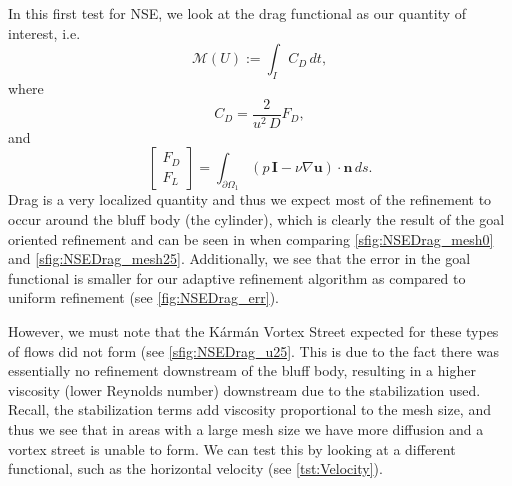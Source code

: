 \begin{test} \label{tst:Drag}
    In this first test for NSE, we look at the drag functional as our quantity
    of interest, i.e.
    \begin{equation}
        \mathcal{M}(U) := \int_I\! C_D\, dt,
        \label{eq:DragFunctional}
    \end{equation}
    where
    \begin{equation*}
        C_D = \frac{2}{u^2\, D}F_D,
    \end{equation*}
    and
    \begin{equation*}
        \begin{bmatrix} F_D \\ F_L \end{bmatrix} =
            \int_{\partial \Omega_1}\! (p\, \mathbf{I} - \nu \nabla
                \mathbf{u})\cdot \mathbf{n}\, ds.
    \end{equation*}
    Drag is a very localized quantity and thus we expect most of the refinement
    to occur around the bluff body (the cylinder), which is clearly the result
    of the goal oriented refinement and can be seen in when comparing
    \autoref{sfig:NSEDrag_mesh0} and \autoref{sfig:NSEDrag_mesh25}.
    Additionally, we see that the error in the goal functional is smaller for
    our adaptive refinement algorithm as compared to uniform refinement (see
    \autoref{fig:NSEDrag_err}).

    However, we must note that the K\'arm\'an Vortex Street expected for these
    types of flows did not form (see \autoref{sfig:NSEDrag_u25}. This is due to
    the fact there was essentially no refinement downstream of the bluff body,
    resulting in a higher viscosity (lower Reynolds number) downstream due to
    the stabilization used. Recall, the stabilization terms add viscosity
    proportional to the mesh size, and thus we see that in areas with a large
    mesh size we have more diffusion and a vortex street is unable to form. We
    can test this by looking at a different functional, such as the horizontal
    velocity (see \autoref{tst:Velocity}).


\end{test}
